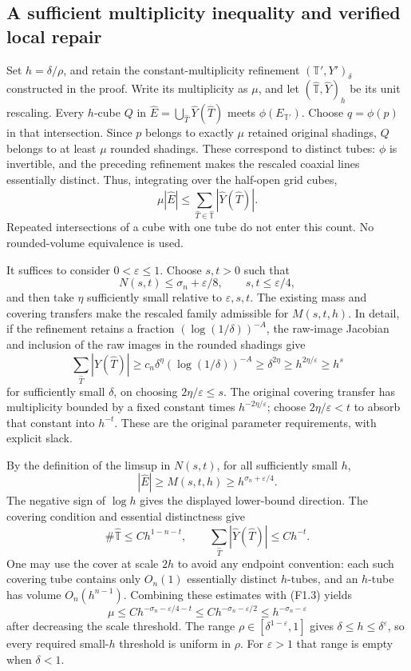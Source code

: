 \documentclass[10pt]{article}
\begin{document}
\subsection*{A sufficient multiplicity inequality and verified local repair}
Set \(h=\delta/\rho\), and retain the constant-multiplicity refinement \((\mathbb T',Y')_\delta\) constructed in the proof. Write its multiplicity as \(\mu\), and let \((\widehat{\mathbb T},\widehat Y)_h\) be its unit rescaling. Every \(h\)-cube \(Q\) in \(\widehat E=\bigcup_{\widehat T}\widehat Y(\widehat T)\) meets \(\phi(E_{\mathbb T'})\). Choose \(q=\phi(p)\) in that intersection. Since \(p\) belongs to exactly \(\mu\) retained original shadings, \(Q\) belongs to at least \(\mu\) rounded shadings. These correspond to distinct tubes: \(\phi\) is invertible, and the preceding refinement makes the rescaled coaxial lines essentially distinct. Thus, integrating over the half-open grid cubes, \[\mu|\widehat E|
 \le \sum_{\widehat T\in\widehat{\mathbb T}}|\widehat Y(\widehat T)|.
 \tag{F1.3}\] Repeated intersections of a cube with one tube do not enter this count. No rounded-volume equivalence is used.\par
It suffices to consider \(0<\varepsilon\le1\). Choose \(s,t>0\) such that \[N(s,t)\le\sigma_n+\varepsilon/8,\qquad s,t\le\varepsilon/4,\] and then take \(\eta\) sufficiently small relative to \(\varepsilon,s,t\). The existing mass and covering transfers make the rescaled family admissible for \(M(s,t,h)\). In detail, if the refinement retains a fraction \((\log(1/\delta))^{-A}\), the raw-image Jacobian and inclusion of the raw images in the rounded shadings give \[\sum_{\widehat T}|\widehat Y(\widehat T)|
 \ge c_n\delta^\eta(\log(1/\delta))^{-A}
 \ge\delta^{2\eta}\ge h^{2\eta/\varepsilon}\ge h^s\] for sufficiently small \(\delta\), on choosing \(2\eta/\varepsilon\le s\). The original covering transfer has multiplicity bounded by a fixed constant times \(h^{-2\eta/\varepsilon}\); choose \(2\eta/\varepsilon<t\) to absorb that constant into \(h^{-t}\). These are the original parameter requirements, with explicit slack.\par
By the definition of the limsup in \(N(s,t)\), for all sufficiently small \(h\), \[|\widehat E|\ge M(s,t,h)\ge h^{\sigma_n+\varepsilon/4}.\] The negative sign of \(\log h\) gives the displayed lower-bound direction. The covering condition and essential distinctness give \[\#\widehat{\mathbb T}\le C h^{1-n-t},\qquad
 \sum_{\widehat T}|\widehat Y(\widehat T)|\le C h^{-t}.\] One may use the cover at scale \(2h\) to avoid any endpoint convention: each such covering tube contains only \(O_n(1)\) essentially distinct \(h\)-tubes, and an \(h\)-tube has volume \(O_n(h^{n-1})\). Combining these estimates with (F1.3) yields \[\mu\le C h^{-\sigma_n-\varepsilon/4-t}
 \le C h^{-\sigma_n-\varepsilon/2}
 \le h^{-\sigma_n-\varepsilon}\] after decreasing the scale threshold. The range \(\rho\in[\delta^{1-\varepsilon},1]\) gives \(\delta\le h\le\delta^\varepsilon\), so every required small-\(h\) threshold is uniform in \(\rho\). For \(\varepsilon>1\) that range is empty when \(\delta<1\).\par
\end{document}
